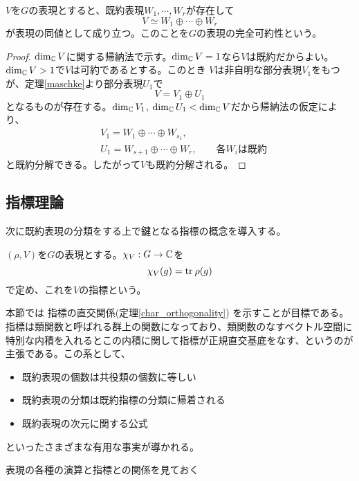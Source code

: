 \documentclass{ltjsarticle}
\begin{document}
\begin{cor}\label{irr_decompose}
  $V$を$G$の表現とすると、既約表現$W_1,\cdots,W_r$が存在して
  \[
  V\simeq W_1\oplus\cdots\oplus W_r  
  \]
  が表現の同値として成り立つ。このことを$G$の表現の完全可約性という。
\end{cor}

\begin{proof}
  $\dim_{\mathbb{C}} V$に関する帰納法で示す。$\dim_{\mathbb{C}} V=1$なら$V$は既約だからよい。$\dim_{\mathbb{C}} V>1$で$V$は可約であるとする。このとき
  $V$は非自明な部分表現$V_1$をもつが、定理\ref{maschke}より部分表現$U_1$で
  \[
  V=V_1\oplus U_1  
  \]
  となるものが存在する。$\dim_{\mathbb{C}} V_1$, $\dim_{\mathbb{C}} U_1<\dim_{\mathbb{C}} V$だから帰納法の仮定により、
  \begin{align*}
    &V_1=W_1\oplus\cdots\oplus W_{s_1},\\
    &U_1=W_{s+1}\oplus\cdots\oplus W_{r},\qquad\text{各$W_i$は既約}
  \end{align*}
  と既約分解できる。したがって$V$も既約分解される。
\end{proof}





\subsection{指標理論}

次に既約表現の分類をする上で鍵となる指標の概念を導入する。

\begin{defin}
  $(\rho,V)$を$G$の表現とする。$\chi_V:G\rightarrow\mathbb{C}$を
  \[
  \chi_V(g)=\text{tr}\: \rho(g)
  \]
  で定め、これを$V$の指標という。
\end{defin}

本節では
指標の直交関係(定理\ref{char_orthogonality})
を示すことが目標である。指標は類関数と呼ばれる群上の関数になっており、類関数のなすベクトル空間に特別な内積を入れるとこの内積に関して指標が正規直交基底をなす、というのが主張である。この系として、
\begin{itemize}
  \item 既約表現の個数は共役類の個数に等しい
  \item 既約表現の分類は既約指標の分類に帰着される
  \item 既約表現の次元に関する公式
\end{itemize}
といったさまざまな有用な事実が導かれる。

表現の各種の演算と指標との関係を見ておく
\end{document}
